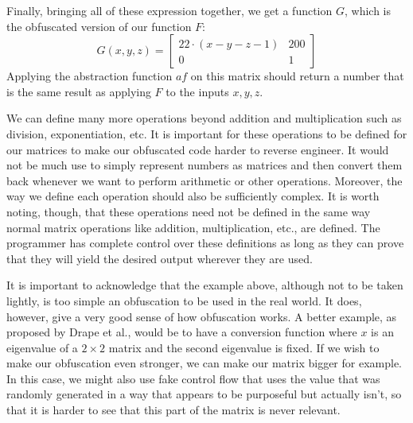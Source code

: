 Finally, bringing all of these expression together, we get a function $ G $,
which is the obfuscated version of our function $ F $:
\begin{equation*}
    G(x, y, z) =
    \begin{bmatrix}
        22 \cdot (x - y -z - 1) & 200 \\
        0 & 1
    \end{bmatrix}
\end{equation*}
Applying the abstraction function $ af $ on this matrix should return a number
that is
the same result as applying $ F $ to the inputs $ x, y, z $.

We can define many more operations beyond addition and multiplication such as
division, exponentiation, etc. It is important for
these operations to be defined for our matrices to make our obfuscated code
harder to reverse engineer. It would not be much use to simply represent
numbers as
matrices and then convert them back whenever we want to perform arithmetic or
other operations. Moreover, the way we define each operation should also be
sufficiently complex. It is worth noting, though, that these operations need
not be defined in the same way normal matrix operations like addition,
multiplication, etc., are defined. The programmer has complete control over
these definitions as long as they can prove that they will yield the desired
output wherever they are used.

It is important to acknowledge that the example above, although not to be taken
lightly, is too simple an
obfuscation to be used in the real world. It does, however, give a very good
sense of how
obfuscation works. A better example, as proposed by Drape et al., would be to
have a conversion function where $ x $ is an eigenvalue of a $ 2 \times 2 $
matrix and the second eigenvalue is fixed. If we wish to make our obfuscation
even stronger, we can make our matrix bigger for example. In this case, we might
also use fake control flow that uses the value that was randomly generated in a 
way that appears to be purposeful but actually isn't, so that it is harder to see
that this part of the matrix is never relevant.

